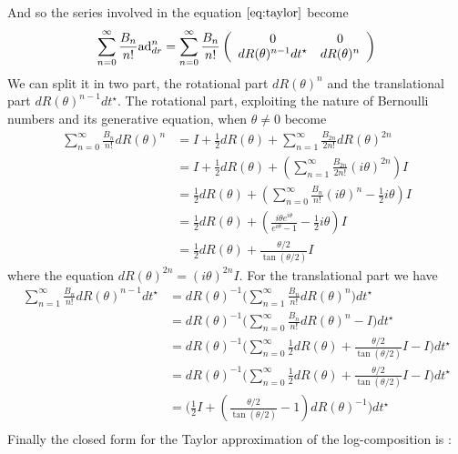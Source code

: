And so the series involved in the equation $\ref{eq:taylor}$ become
\begin{align*}
\sum_{n=0}^{\infty} \frac{B_{n}}{n!} \text{ad}_{dr}^{ n} 
=
\sum_{n=0}^{\infty} \frac{B_{n}}{n!} \left (
\begin{array} {c c}
0            &  0        \\
dR(\theta)^{n-1}dt^{\star}      &  dR(\theta)^{n}      
\end{array}
\right ) 
\end{align*}
We can split it in two part, the rotational part $dR(\theta)^{n}$ and the translational part $dR(\theta)^{n-1}dt^{\star}$. The rotational part, exploiting the nature of Bernoulli numbers and its generative equation, when $\theta \neq 0$ become
\begin{align*}
\sum_{n=0}^{\infty} \frac{B_{n}}{n!} dR(\theta)^{n}  
&=
I + \frac{1}{2}dR(\theta) + \sum_{n=1}^{\infty}\frac{B_{2n}}{2n!} dR(\theta)^{2n}  \\
&=
I + \frac{1}{2}dR(\theta) + (\sum_{n=1}^{\infty}\frac{B_{2n}}{2n!} (i \theta)^{2n})I  \\
&=
\frac{1}{2}dR(\theta) + (\sum_{n=0}^{\infty}\frac{B_{n}}{n!}(i \theta)^{n} - \frac{1}{2} i\theta) I  \\
&=
\frac{1}{2}dR(\theta) + (\frac{i\theta e^{i\theta}}{e^{i\theta} - 1} - \frac{1}{2} i\theta) I  \\
&=
\frac{1}{2}dR(\theta) +  \frac{\theta /2}{\tan(\theta/2)} I  
\end{align*}
where the equation $dR(\theta)^{2n} =  (i \theta)^{2n}I  $. For the translational part we have
\begin{align*}
\sum_{n=1}^{\infty} \frac{B_{n}}{n!} dR(\theta)^{n-1} dt^{\star} 
&=
dR(\theta)^{-1} \Big(\sum_{n=1}^{\infty}\frac{B_{n}}{n!} dR(\theta)^{n}\Big)dt^{\star} \\
&=
dR(\theta)^{-1}  \Big(\sum_{n=0}^{\infty}\frac{B_{n}}{n!} dR(\theta)^{n} - I \Big)dt^{\star}  \\
&=
dR(\theta)^{-1}  \Big(\sum_{n=0}^{\infty} \frac{1}{2}dR(\theta) +  \frac{\theta /2}{\tan(\theta/2)} I  - I \Big) dt^{\star} \\ 
&=
dR(\theta)^{-1}  \Big(\sum_{n=0}^{\infty} \frac{1}{2}dR(\theta) +  \frac{\theta /2}{\tan(\theta/2)} I  - I \Big)dt^{\star} \\
&=
\Big(\frac{1}{2} I + (\frac{\theta /2}{\tan(\theta/2)} - 1)dR(\theta)^{-1}   \Big) dt^{\star}    \\
\end{align*}
Finally the closed form for the Taylor approximation of the log-composition is \cite{vercauteren2014preprint}:
